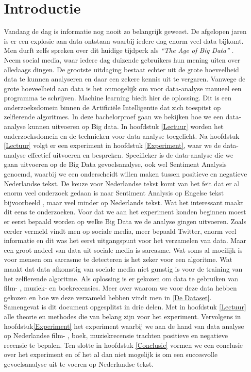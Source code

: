 \chapter{Introductie}\label{introductie}
Vandaag de dag is informatie nog nooit zo belangrijk geweest. De afgelopen jaren is er een explosie aan data ontstaan waarbij iedere dag enorm veel data bijkomt. Men durft zelfs spreken over dit huidige tijdperk als \textit{``The Age of Big Data''} \cite{lohr2012age}. Neem social media, waar iedere dag duizende gebruikers hun mening uiten over alledaags dingen. De grootste uitdaging bestaat echter uit de grote hoeveelheid data te kunnen analyseren en daar een zekere kennis uit te vergaren. Vanwege de grote hoeveelheid aan data is het onmogelijk om voor data-analyse manueel een programma te schrijven. Machine learning biedt hier de oplossing. Dit is een onderzoeksdomein binnen de Artifici\"ele Intelligentie dat zich toespitst op zelflerende algoritmes. In deze bachelorproef gaan we bekijken hoe we een data-analyse kunnen uitvoeren op Big data. In hoofdstuk \ref{Lectuur} worden het onderzoeksdomein en de technieken voor data-analyse toegelicht. Na hoofdstuk \ref{Lectuur} volgt er een experiment in hoofdstuk \ref{Experiment}, waar we de data-analyse effectief uitvoeren en bespreken.
\newline
Specifieker is de data-analyse die we gaan uitvoeren op de Big Data gevoelsanalyse, ook wel Sentiment Analysis genoemd, waarbij we een onderscheidt willen maken tussen positieve en negatieve Nederlandse tekst. De keuze voor Nederlandse tekst komt van het feit dat er al enorm veel onderzoek gedaan is naar Sentiment Analysis op Engelse tekst bijvoorbeeld \cite{pang2008opinion} , maar veel minder op Nederlands tekst. Wat het interessant maakt dit eens te onderzoeken. 
\newline
Voor dat we aan het experiment konden beginnen moest er eerst bepaald worden op welke Big Data we de analyse gingen uitvoeren. Zoals eerder vermeld vindt men op sociale media, meer bepaald Twitter, enorm veel informatie en dit was het eerst uitgangspunt voor het verzamelen van data. Maar een groot nadeel van data uit sociale media is sarcasme. Wat soms al moeilijk is voor mensen om sarcasme te detecteren is het zeker voor een algoritme. Wat maakt dat data afkomstig van sociale media niet gunstig is voor de training van het zelflerende algoritme. Als oplossing is er gekozen om data te gebruiken van film- , muziek- en boekrecensies. Meer over waarom we voor deze data hebben gekozen en hoe we deze verzameld hebben vindt men in \ref{De Dataset}.
\newline
Samengevat is dit document opgesplitst in drie delen. Met in hoofdstuk \ref{Lectuur} alle theorie en methodes die van belang zijn voor het experiment. Vervolgens in hoofdstuk\ref{Experiment} het experiment waarbij we aan de hand van data analyse op Nederlandse film- , boek, muziekrecensie trachten positieve en negatieve recensie te bepalen. Ten slotte in hoofdstuk \ref{Conclusie} vormen we een conclusie over het experiment en of het al dan niet mogelijk is om een succesvolle gevoelsanalyse uit te voeren op Nederlandse tekst.